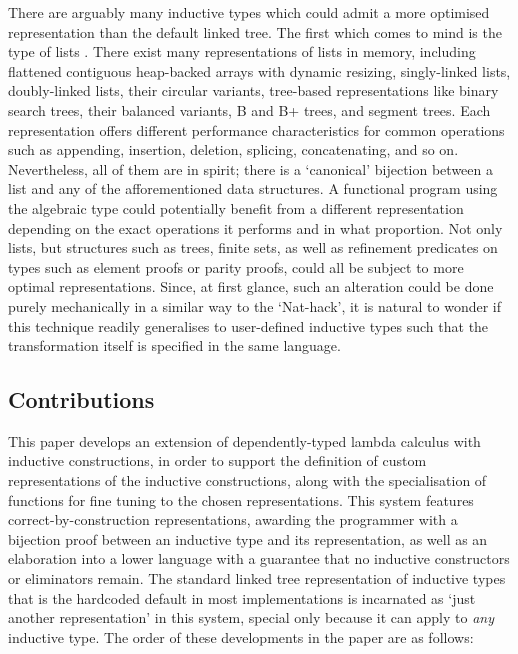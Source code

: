There are arguably many inductive types which could admit a more optimised
representation than the default linked tree. The first which comes to mind is
the type of lists . There exist many
representations of lists in memory, including flattened contiguous heap-backed
arrays with dynamic resizing, singly-linked lists, doubly-linked lists, their
circular variants, tree-based representations like binary search trees, their
balanced variants, B and B+ trees, and segment trees. Each representation
offers different performance characteristics for common operations such as
appending, insertion, deletion, splicing, concatenating, and so on.
Nevertheless, all of them are  in spirit; there is a `canonical'
bijection between a list and any of the afforementioned data structures. A
functional program using the algebraic  type could potentially
benefit from a different representation depending on the exact operations it
performs and in what proportion. Not only lists, but structures such as trees,
finite sets, as well as refinement predicates on types such as element proofs
or parity proofs, could all be subject to more optimal representations. Since,
at first glance, such an alteration could be done purely mechanically in a
similar way to the `Nat-hack', it is natural to wonder if this technique
readily generalises to user-defined inductive types such that the
transformation itself is specified in the same language.

\subsection{Contributions}

This paper develops an extension of dependently-typed lambda calculus with
inductive constructions, in order to support the definition of custom
representations of the inductive constructions, along with the specialisation
of functions for fine tuning to the chosen representations. This system
features correct-by-construction representations, awarding the programmer with
a bijection proof between an inductive type and its representation, as well as
an elaboration into a lower language with a guarantee that no inductive
constructors or eliminators remain. The standard linked tree representation of
inductive types that is the hardcoded default in most implementations is
incarnated as `just another representation' in this system, special only
because it can apply to \emph{any} inductive type. The order of these
developments in the paper are as follows:

